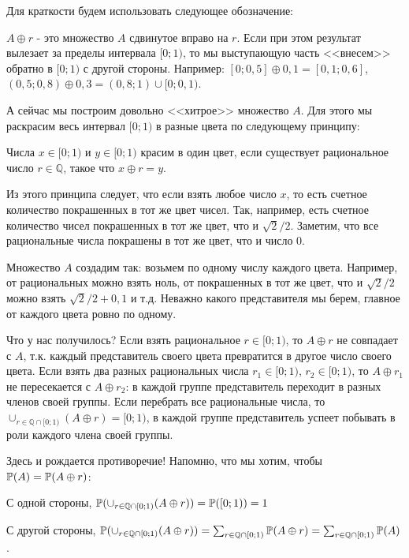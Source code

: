 {Для краткости будем использовать следующее обозначение:

\begin{mydef} $A\oplus r$ - это множество $A$ сдвинутое вправо на $r$. Если при этом результат вылезает за пределы интервала $[0;1)$, то мы выступающую часть <<внесем>> обратно в $[0;1)$ с другой стороны. Например: $[0;0,5]\oplus 0,1=[0,1;0,6]$, $(0,5;0,8)\oplus 0,3=(0,8;1)\cup [0;0,1)$.
\end{mydef}

А сейчас мы построим довольно <<хитрое>> множество $A$. Для этого мы раскрасим весь интервал $[0;1)$ в разные цвета по следующему принципу:

Числа $x\in[0;1)$ и $y\in[0;1)$ красим в один цвет, если существует рациональное число $r\in\mathbb{Q}$, такое что $x\oplus r=y$.

Из этого принципа следует, что если взять любое число $x$, то есть счетное количество покрашенных в тот же цвет чисел. Так, например, есть счетное количество чисел покрашенных в тот же цвет, что и $\sqrt{2}/2$. Заметим, что все рациональные числа покрашены в тот же цвет, что и число $0$.


Множество $A$ создадим так: возьмем по одному числу каждого цвета. Например, от рациональных можно взять ноль, от покрашенных в тот же цвет, что и $\sqrt{2}/2$ можно взять $\sqrt{2}/2+0,1$ и т.д. Неважно какого представителя мы берем, главное от каждого цвета ровно по одному.

Что у нас получилось? Если взять рациональное $r\in[0;1)$, то $A\oplus r$ не совпадает с $A$, т.к. каждый представитель своего цвета превратится в другое число своего цвета. Если взять два разных рациональных числа $r_{1}\in [0;1)$, $r_{2}\in[0;1)$, то $A\oplus r_{1}$ не пересекается с $A\oplus r_{2}$: в каждой группе представитель переходит в разных членов своей группы. Если перебрать все рациональные числа, то $\cup_{r\in\mathbb{Q}\cap [0;1)} (A\oplus r)=[0;1)$, в каждой группе представитель успеет побывать в роли каждого члена своей группы.

Здесь и рождается противоречие! Напомню, что мы хотим, чтобы $\P(A)=\P(A\oplus r)$:

С одной стороны,  $\P(\cup_{r\in\mathbb{Q}\cap [0;1)} (A\oplus r))=\P([0;1))=1$

С другой стороны, $\P(\cup_{r\in\mathbb{Q}\cap [0;1)} (A\oplus r))=\sum_{r\in\mathbb{Q}\cap [0;1)} \P(A\oplus r)=\sum_{r\in\mathbb{Q}\cap [0;1)} \P(A)$.

}
